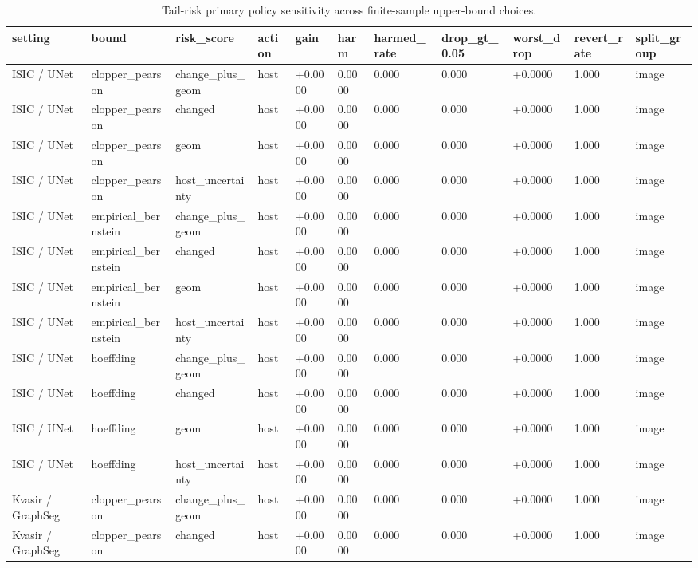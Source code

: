\begin{table}[t]
\centering
\small
\caption{Tail-risk primary policy sensitivity across finite-sample upper-bound choices.}
\label{tab:tail_risk_bound_sensitivity}
\begin{tabular}{lllllllllll}
\toprule
setting & bound & risk\_score & action & gain & harm & harmed\_rate & drop\_gt\_0.05 & worst\_drop & revert\_rate & split\_group \\
\midrule
ISIC / UNet & clopper\_pearson & change\_plus\_geom & host & +0.0000 & 0.0000 & 0.000 & 0.000 & +0.0000 & 1.000 & image \\
ISIC / UNet & clopper\_pearson & changed & host & +0.0000 & 0.0000 & 0.000 & 0.000 & +0.0000 & 1.000 & image \\
ISIC / UNet & clopper\_pearson & geom & host & +0.0000 & 0.0000 & 0.000 & 0.000 & +0.0000 & 1.000 & image \\
ISIC / UNet & clopper\_pearson & host\_uncertainty & host & +0.0000 & 0.0000 & 0.000 & 0.000 & +0.0000 & 1.000 & image \\
ISIC / UNet & empirical\_bernstein & change\_plus\_geom & host & +0.0000 & 0.0000 & 0.000 & 0.000 & +0.0000 & 1.000 & image \\
ISIC / UNet & empirical\_bernstein & changed & host & +0.0000 & 0.0000 & 0.000 & 0.000 & +0.0000 & 1.000 & image \\
ISIC / UNet & empirical\_bernstein & geom & host & +0.0000 & 0.0000 & 0.000 & 0.000 & +0.0000 & 1.000 & image \\
ISIC / UNet & empirical\_bernstein & host\_uncertainty & host & +0.0000 & 0.0000 & 0.000 & 0.000 & +0.0000 & 1.000 & image \\
ISIC / UNet & hoeffding & change\_plus\_geom & host & +0.0000 & 0.0000 & 0.000 & 0.000 & +0.0000 & 1.000 & image \\
ISIC / UNet & hoeffding & changed & host & +0.0000 & 0.0000 & 0.000 & 0.000 & +0.0000 & 1.000 & image \\
ISIC / UNet & hoeffding & geom & host & +0.0000 & 0.0000 & 0.000 & 0.000 & +0.0000 & 1.000 & image \\
ISIC / UNet & hoeffding & host\_uncertainty & host & +0.0000 & 0.0000 & 0.000 & 0.000 & +0.0000 & 1.000 & image \\
Kvasir / GraphSeg & clopper\_pearson & change\_plus\_geom & host & +0.0000 & 0.0000 & 0.000 & 0.000 & +0.0000 & 1.000 & image \\
Kvasir / GraphSeg & clopper\_pearson & changed & host & +0.0000 & 0.0000 & 0.000 & 0.000 & +0.0000 & 1.000 & image \\

\end{tabular}
\end{table}
